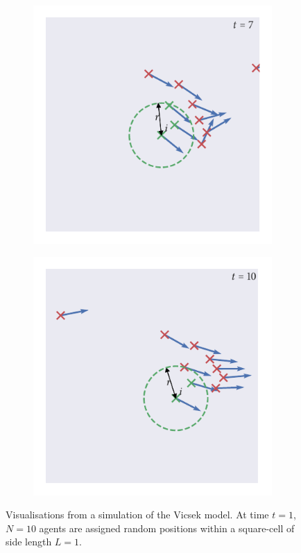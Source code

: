 \begin{figure}[tb]
\begin{subfigure}[b]{0.5\textwidth}
        \includegraphics{vicsek_simulation_7.pdf}
    \end{subfigure}%
    \begin{subfigure}[b]{0.5\textwidth}
        \includegraphics{vicsek_simulation_10.pdf}
    \end{subfigure}
    \caption{Visualisations from a simulation of the Vicsek model. At time $t=1$, $N=10$
        agents are assigned random positions within a square-cell of side length $L=1$.
}
\end{figure}
